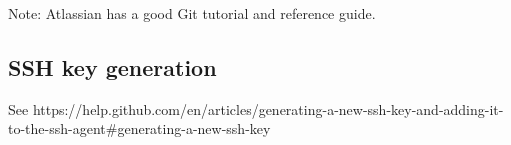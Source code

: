 \documentclass{article}
\begin{document}
Note: Atlassian has a good Git tutorial and reference guide. 

\subsection*{SSH key generation}

See https://help.github.com/en/articles/generating-a-new-ssh-key-and-adding-it-to-the-ssh-agent\#generating-a-new-ssh-key 



\end{document}
